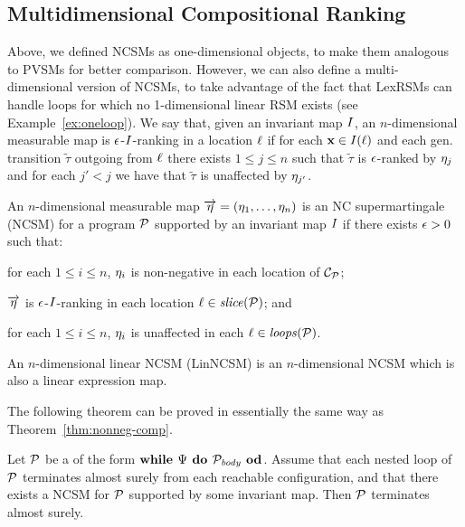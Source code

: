 \subsection{Multidimensional Compositional Ranking}

 Above, we defined NCSMs as one-dimensional objects, to make them analogous to 
 PVSMs for better comparison. However, we can also define a multi-dimensional 
 version of NCSMs, to take advantage of the fact that LexRSMs can handle loops 
 for which no 1-dimensional linear RSM exists (see Example~\ref{ex:oneloop}). 
 We say that, given an invariant map $I$, an $n$-dimensional measurable map 
 is $\epsilon$-$I$-ranking in a location $\ell$ if for each $\mathbf{x}\in 
 I(\ell)$ and each gen. transition $\tilde{\tau}$ outgoing from $\ell$ there 
 exists $1\leq j \leq n$ such that $\tilde\tau$ is $\epsilon$-ranked by $\eta_j$ 
 and for each $j'<j$ we have that  $\tilde{\tau}$ is unaffected by $\eta_{j'}$.

\begin{definition}
An $n$-dimensional measurable map $\overrightarrow{\eta}=(\eta_1,\dots,\eta_n)$ 
is an NC supermartingale (NCSM) for a program $\mathcal{P}$ supported by an 
invariant map $I$ if there exists $\epsilon>0$ such that:
\begin{compactenum}
	\item  for each $1\leq i \leq n$, $\eta_i$ is non-negative in each location of $\mathcal{C}_{\mathcal{P}}$;
	\item 
	$\overrightarrow{\eta}$ is $\epsilon$-$I$-ranking in each location 
	$\ell\in\mathit{slice}{(\mathcal{P})}$; and
	\item 
	for each $1\leq i \leq n$, $\eta_i$ is
	unaffected in each $\ell\in\mathit{loops}(\mathcal{P})$.
\end{compactenum}
An $n$-dimensional linear NCSM (LinNCSM) is an $n$-dimensional NCSM which is also a linear expression map.
\end{definition}

The following theorem can be proved in essentially the same way as Theorem~\ref{thm:nonneg-comp}.

\begin{theorem}
Let $\mathcal{P}$ be a \PP{} of the form $\textbf{while } \Psi \textbf{ do } 
\mathcal{P}_{\mathit{body}} \textbf{ od}$. Assume that each nested loop of $\mathcal{P}$ terminates almost surely from each reachable configuration, and that there exists a NCSM for $\mathcal{P}$ supported by some invariant map. Then $\mathcal{P}$ terminates almost surely.
\end{theorem}

